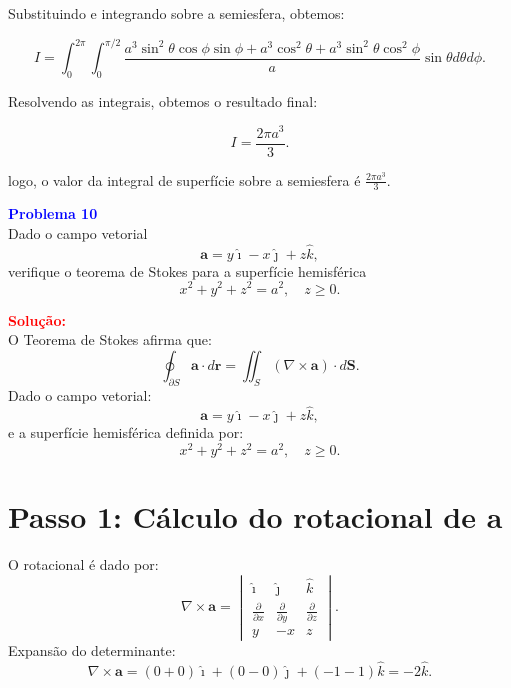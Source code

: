 \documentclass[a4paper,12pt]{article}
\begin{document}
\begin{flushleft}
Substituindo e integrando sobre a semiesfera, obtemos:

\begin{equation}
I = \int_0^{2\pi} \int_0^{\pi/2} \frac{a^3 \sin^2 \theta \cos \phi \sin \phi + a^3 \cos^2 \theta + a^3 \sin^2 \theta \cos^2 \phi}{a} \sin \theta d\theta d\phi.
\end{equation}

Resolvendo as integrais, obtemos o resultado final:

\begin{equation}
I = \frac{2\pi a^3}{3}.
\end{equation}

logo, o valor da integral de superfície sobre a semiesfera é $\frac{2\pi a^3}{3}$.
\end{flushleft}

\begin{flushleft}
\textbf{\textcolor{blue}{Problema 10}}\\
Dado o campo vetorial  
\[
\mathbf{a} = y\hat{\imath} - x\hat{\jmath} + z\hat{k},
\]
verifique o teorema de Stokes para a superfície hemisférica  
\[
x^2 + y^2 + z^2 = a^2, \quad z \geq 0.
\]

\textcolor{red}{\textbf{Solução:}}\\

O Teorema de Stokes afirma que:
\begin{equation}
    \oint_{\partial S} \mathbf{a} \cdot d\mathbf{r} = \iint_{S} (\nabla \times \mathbf{a}) \cdot d\mathbf{S}.
\end{equation}
Dado o campo vetorial:
\begin{equation}
    \mathbf{a} = y\hat{\imath} - x\hat{\jmath} + z\hat{k},
\end{equation}
e a superfície hemisférica definida por:
\begin{equation}
    x^2 + y^2 + z^2 = a^2, \quad z \geq 0.
\end{equation}

\section*{Passo 1: Cálculo do rotacional de $\mathbf{a}$}
O rotacional é dado por:
\begin{equation}
    \nabla \times \mathbf{a} =
    \begin{vmatrix} 
    \hat{\imath} & \hat{\jmath} & \hat{k} \\
    \frac{\partial}{\partial x} & \frac{\partial}{\partial y} & \frac{\partial}{\partial z} \\
    y & -x & z
    \end{vmatrix}.
\end{equation}
Expansão do determinante:
\begin{equation}
    \nabla \times \mathbf{a} = (0 + 0)\hat{\imath} + (0 - 0)\hat{\jmath} + (-1 - 1)\hat{k} = -2\hat{k}.
\end{equation}


\end{flushleft}
\end{document}
